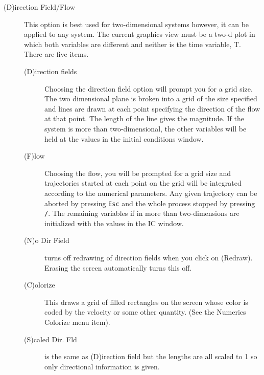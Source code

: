 \documentclass{article}
\newcommand{\tc}[1]{\addcontentsline{toc}{subsection}{#1}}
\begin{document}
\begin{description}
\begin{description}
\end{description}
\tc{Direction Field/Flow}\item[(D)irection Field/Flow]
This option is best used for two-dimensional systems however,
 it can be applied to any system.  The current graphics view must be a
 two-d plot in which both variables are different and neither is the time
 variable, T.  There are five items.
\begin{description}
\item[(D)irection fields] Choosing the direction field option will prompt you for
a grid size.  The two dimensional plane is broken into a grid of the size
 specified and lines are drawn at each point specifying the direction of
the flow at that point. The length of the line gives the
magnitude. If the system is more than two-dimensional, the
 other variables will be held at the values in the initial conditions
window.
\item[(F)low] Choosing the flow, you will be prompted for a grid size
and
 trajectories
 started at each point on the grid will be integrated according to the
 numerical parameters.  Any given trajectory can be aborted by pressing
{\tt Esc} and the whole process stopped by pressing {\tt /}.  The
remaining
 variables
if in more than two-dimensions are initialized with the values in the
IC window.
\item[(N)o Dir Field] turns off redrawing of direction fields when you
click on (Redraw).  Erasing the screen automatically turns this off.
\item[(C)olorize] This draws a grid of filled rectangles on the screen
whose color is coded by the velocity or some other quantity. (See the
Numerics Colorize menu item).
\item[(S)caled Dir. Fld] is the same as (D)irection field but the
lengths are all scaled to 1 so only directional information is given.
\end{description}



\end{description}
\end{document}
